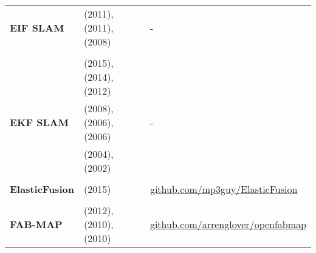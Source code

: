 \documentclass[a4paper,12pt]{scrartcl}
\begin{document}
{\begin{longtable}{l|l|l}
    \textbf{EIF SLAM}                                                                                                             & \cite{He2011} (2011), \cite{AuatCheein2011} (2011), \cite{Zhou2008} (2008)                 & - \\
                                                                                                                                  &                                                                                            &   \\ [-3mm]
                                                                                                                                  & \cite{Samsuri2015} (2015), \cite{Sola2014} (2014), \cite{Kurt-Yavuz2012} (2012)            &   \\
    \textbf{EKF SLAM}                                                                                                             & \cite{Paz2008} (2008), \cite{Bailey2006} (2006), \cite{Bailey2006a} (2006)                 & - \\
                                                                                                                                  & \cite{Riisgaard2004} (2004), \cite{Thrun1999} (2002)                                       &   \\
                                                                                                                                  &                                                                                            &   \\ [-3mm]
    \textbf{ElasticFusion}                                                                                                        & \cite{Whelan2015} (2015)
                                                                                                                                  & {\href{https://github.com/mp3guy/ElasticFusion}{github.com/mp3guy/ElasticFusion}}         \\
                                                                                                                                  &                                                                                            &   \\ [-3mm]
    \textbf{FAB-MAP}                                                                                                              & \cite{Glover2012} (2012), \cite{Glover2010} (2010), \cite{Paul2010} (2010)
                                                                                                                                  & {\href{https://github.com/arrenglover/openfabmap}{github.com/arrenglover/openfabmap}}     \\

\end{longtable}}
\end{document}
